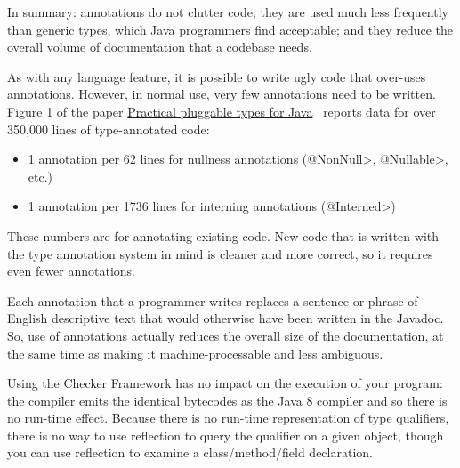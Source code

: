 

In summary:  annotations do not clutter code; they are used much
less frequently than generic types, which Java programmers find acceptable;
and they reduce the overall volume of documentation that a codebase needs.

As with any language feature, it is possible to write ugly code that
over-uses annotations.  However, in normal use, very few annotations need
to be written.  Figure 1 of the paper
\href{https://homes.cs.washington.edu/~mernst/pubs/pluggable-checkers-issta2008-abstract.html}{Practical
  pluggable types for Java}~\cite{PapiACPE2008} reports data for over
350,000 lines of type-annotated code:

\begin{itemize}
\item
    1 annotation per 62 lines for nullness annotations (\<@NonNull>, \<@Nullable>, etc.)
\item
    1 annotation per 1736 lines for interning annotations (\<@Interned>)
\end{itemize}


These numbers are for annotating existing code.  New code that
is written with the type annotation system in mind is cleaner and more
correct, so it requires even fewer annotations.

Each annotation that a programmer writes replaces a sentence or phrase of
English descriptive text that would otherwise have been written in the
Javadoc.  So, use of annotations actually reduces the overall size of the
documentation, at the same time as making it machine-processable
and less ambiguous.



Using the Checker Framework has no impact on the execution of your program:
the compiler emits the identical bytecodes as the Java 8
compiler and so there is no run-time effect.  Because there is no run-time
representation of type qualifiers, there is no way to use reflection to
query the qualifier on a given object, though you can use reflection to
examine a class/method/field declaration.

